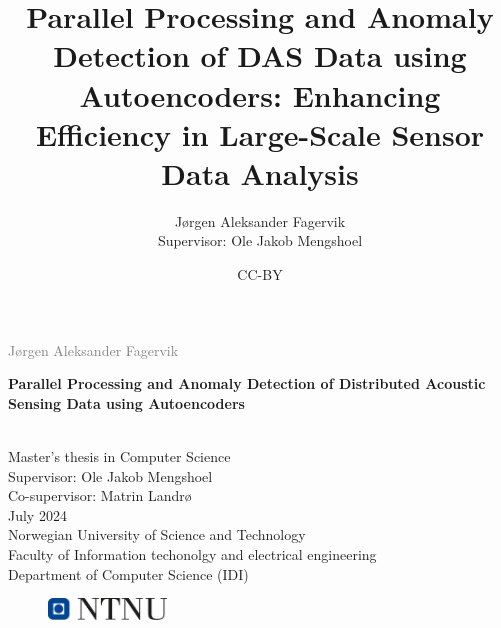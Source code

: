 \documentclass[british]{ntnuthesis}
\title{Parallel Processing and Anomaly Detection of DAS Data using Autoencoders: Enhancing Efficiency in Large-Scale Sensor Data Analysis}
\author{Jørgen Aleksander Fagervik \\
        Supervisor: Ole Jakob Mengshoel}
\date{CC-BY \ntnuthesisdate}
\begin{document}
\begin{titlepage}
\vspace*{1.5cm}

\noindent  \textcolor{gray}{\large Jørgen Aleksander Fagervik} \\
\vspace{1cm}

\noindent \textbf{\Large Parallel Processing and Anomaly Detection of Distributed Acoustic Sensing Data using Autoencoders } \\
\vspace{0.5cm}

 \\



\vspace{7cm}
\noindent Master's thesis in Computer Science \\
Supervisor: Ole Jakob Mengshoel \\
Co-supervisor: Matrin Landrø \\
July 2024 \\

\vspace{0.2cm}
\noindent Norwegian University of Science and Technology \\
Faculty of Information techonolgy and electrical engineering \\
Department of Computer Science (IDI) \\

\begin{figure}[h]
    \includegraphics[width=0.28\textwidth]{figures/ntnu_basic.png}
\end{figure}
\end{titlepage}
\restoregeometry
\myemptypage 





\tableofcontents
\listoffigures
\listoftables
\lstlistoflistings

\printglossary[type=\acronymtype] %
\printglossary                    %









\chapter*{\bibname}
\printbibliography[heading=none]

\appendix








\end{document}
